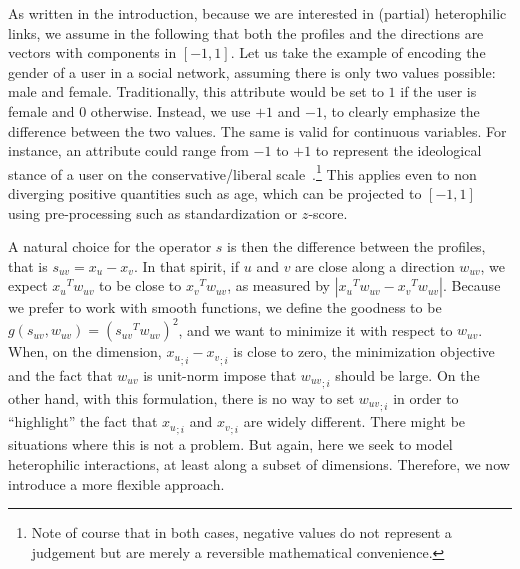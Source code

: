 \medskip

As written in the introduction, because we are interested in (partial) heterophilic links, we assume
in the following that both the profiles and the directions are vectors with components in $[-1, 1]$.
Let us take the example of encoding the gender of a user in a social network, assuming there is only
two values possible: male and female. Traditionally, this attribute would be set to $1$ if the user
is female and $0$ otherwise. Instead, we use $+1$ and $-1$, to clearly emphasize the difference
between the two values. The same is valid for continuous variables. For instance, an attribute could
range from $-1$ to $+1$ to represent the ideological stance of a user on the conservative/liberal
scale~\autocite{newsBias15}.\footnote{Note of course that in both cases, negative values do not
represent a judgement but are merely a reversible mathematical convenience.} This applies even to
non diverging positive quantities such as age, which can be projected to $[-1, 1]$ using
pre-processing such as standardization or $z$-score.

A natural choice for the operator $s$ is then the difference between the profiles, that is
$s_{uv} = x_u - x_v$. In that spirit, if $u$ and $v$ are close along a direction $w_{uv}$, we expect
${x_u}^T w_{uv}$ to be close to ${x_v}^T w_{uv}$, as measured by $|{x_u}^T w_{uv} - {x_v}^T
w_{uv}|$. Because we prefer to work with smooth functions, we define the goodness to be $g(s_{uv},
w_{uv}) = \left({s_{uv}}^T w_{uv} \right)^2$, and we want to minimize it with respect to $w_{uv}$.
When, on the \ith{} dimension, ${x_u}_{;i} - {x_v}_{;i}$ is close to zero, the minimization objective
and the fact that $w_{uv}$ is
unit-norm impose that ${w_{uv}}_{;i}$ should be large. On the other hand, with this formulation,
there is no way to set ${w_{uv}}_{;i}$ in order to \enquote{highlight} the fact that
${x_u}_{;i}$ and ${x_v}_{;i}$ are widely different.
There might be situations where this is not a problem. But again,
here we seek to model heterophilic interactions, at least along a subset of dimensions. Therefore,
we now introduce a more flexible approach.

